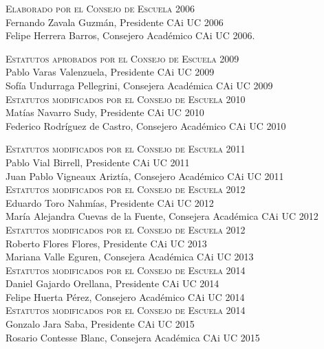\documentclass[letterpaper,11pt]{article}
\theoremstyle{definition}%
\begin{document}
\begin{sloppypar}
	\textsc{Elaborado por el Consejo de Escuela 2006}\\
	Fernando Zavala Guzmán, Presidente CAi UC 2006\\
	Felipe Herrera Barros, Consejero Académico CAi UC 2006.

	\textsc{Estatutos aprobados por el Consejo de Escuela 2009}\\
	Pablo Varas Valenzuela, Presidente CAi UC 2009\\
	Sofía Undurraga Pellegrini, Consejera Académica CAi UC 2009\\

	\textsc{Estatutos modificados por el Consejo de Escuela 2010}\\
	Matías Navarro Sudy, Presidente CAi UC 2010\\
	Federico Rodríguez de Castro, Consejero Académico CAi UC 2010

	\textsc{Estatutos modificados por el Consejo de Escuela 2011}\\
	Pablo Vial Birrell, Presidente CAi UC 2011\\
	Juan Pablo Vigneaux Ariztía, Consejero Académico CAi UC 2011\\

	\textsc{Estatutos modificados por el Consejo de Escuela 2012}\\
	Eduardo Toro Nahmías, Presidente CAi UC 2012\\
	María Alejandra Cuevas de la Fuente, Consejera Académica CAi UC 2012\\

	\textsc{Estatutos modificados por el Consejo de Escuela 2012}\\
	Roberto Flores Flores, Presidente CAi UC 2013\\
	Mariana Valle Eguren, Consejera Académica CAi UC 2013\\

	\textsc{Estatutos modificados por el Consejo de Escuela 2014}\\
	Daniel Gajardo Orellana, Presidente CAi UC 2014\\
	Felipe Huerta Pérez, Consejero Académico CAi UC 2014\\

	\textsc{Estatutos modificados por el Consejo de Escuela 2014}\\
	Gonzalo Jara Saba, Presidente CAi UC 2015\\
	Rosario Contesse Blanc, Consejera Académica CAi UC 2015\\


\end{sloppypar}
\end{document}
